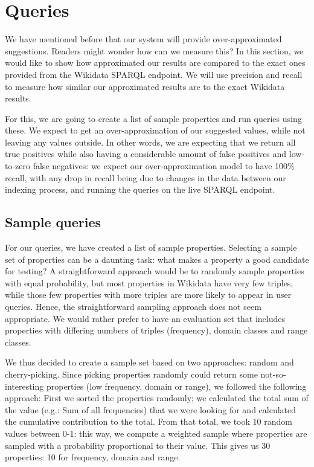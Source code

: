 
\section{Queries}

We have mentioned before that our system will provide over-approximated suggestions. Readers might wonder how can we measure this? In this section, we would like to show how approximated our results are compared to the exact ones provided from the Wikidata SPARQL endpoint. We will use precision and recall to measure how similar our approximated results are to the exact Wikidata results.

For this, we are going to create a list of sample properties and run queries using these. We expect to get an over-approximation of our suggested values, while not leaving any values outside. In other words, we are expecting that we return all true positives while also having a considerable amount of false positives and low-to-zero false negatives: we expect our over-approximation model to have 100\% recall, with any drop in recall being due to changes in the data between our indexing process, and running the queries on the live SPARQL endpoint.

\subsection{Sample queries}
For our queries, we have created a list of sample properties. Selecting a sample set of properties can be a daunting task: what makes a property a good candidate for testing? A straightforward approach would be to randomly sample properties with equal probability, but most properties in Wikidata have very few triples, while those few properties with more triples are more likely to appear in user queries. Hence, the straightforward sampling approach does not seem appropriate. We would rather prefer to have an evaluation set that includes properties with differing numbers of triples (frequency), domain classes and range classes.

We thus decided to create a sample set based on two approaches: random and cherry-picking. Since picking properties randomly could return some not-so-interesting properties (low frequency, domain or range), we followed the following approach: First we sorted the properties randomly; we calculated the total sum of the value (e.g.: Sum of all frequencies) that we were looking for and calculated the cumulative contribution to the total. From that total, we took 10 random values between 0-1: this way, we compute a weighted sample where properties are sampled with a probability proportional to their value. This gives us 30 properties: 10 for frequency, domain and range.

